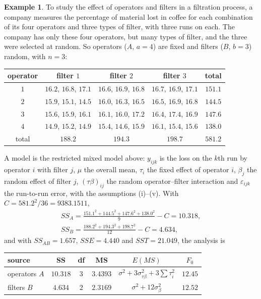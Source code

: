 \documentclass[11pt,a4paper]{article}
\numberwithin{equation}{section}
\theoremstyle{definition}
\newtheorem{exa}[thm]{Example}
\begin{document}
\begin{exa}\label{exa:filter-mixed}
To study the effect of operators and filters in a filtration process, a company measures the percentage of material lost in coffee for each
combination of its four operators and three types of filter, with three runs on each. The company has only these four operators, but many types of
filter, and the three were selected at random. So operators ($A$, $a = 4$) are fixed and filters ($B$, $b = 3$) random, with $n = 3$:
\begin{center}
\begin{tabular}{c|ccc|c}
operator & filter $1$ & filter $2$ & filter $3$ & total \\
\hline
$1$ & $16.2$, $16.8$, $17.1$ & $16.6$, $16.9$, $16.8$ & $16.7$, $16.9$, $17.1$ & $151.1$ \\
$2$ & $15.9$, $15.1$, $14.5$ & $16.0$, $16.3$, $16.5$ & $16.5$, $16.9$, $16.8$ & $144.5$ \\
$3$ & $15.6$, $15.9$, $16.1$ & $16.1$, $16.0$, $17.2$ & $16.4$, $17.4$, $16.9$ & $147.6$ \\
$4$ & $14.9$, $15.2$, $14.9$ & $15.4$, $14.6$, $15.9$ & $16.1$, $15.4$, $15.6$ & $138.0$ \\
\hline
total & $188.2$ & $194.3$ & $198.7$ & $581.2$
\end{tabular}
\end{center}
A model is the restricted mixed model above: $y_{ijk}$ is the loss on the $k$th run by operator $i$ with filter $j$, $\mu$ the overall mean, $\tau_i$ the fixed effect of operator $i$,
$\beta_j$ the random effect of filter $j$, $(\tau\beta)_{ij}$ the random operator--filter interaction and $\varepsilon_{ijk}$ the run-to-run error, with the assumptions (i)--(v). With
$C = 581.2^2/36 = 9383.1511$,
\begin{gather*}
SS_A = \frac{151.1^2 + 144.5^2 + 147.6^2 + 138.0^2}9 - C = 10.318 , \\
SS_B = \frac{188.2^2 + 194.3^2 + 198.7^2}{12} - C = 4.634 ,
\end{gather*}
and with $SS_{AB} = 1.657$, $SSE = 4.440$ and $SST = 21.049$, the analysis is
\begin{center}
\begin{tabular}{l|ccccc}
source & SS & df & MS & $E(MS)$ & $F_0$ \\
\hline
operators $A$ & $10.318$ & $3$ & $3.4393$ & $\sigma^2 + 3\sigma^2_{\tau\beta} + 3\sum\tau_i^2$ & $12.45$ \\
filters $B$ & $4.634$ & $2$ & $2.3169$ & $\sigma^2 + 12\sigma^2_\beta$ & $12.52$ \\

\end{tabular}
\end{center}
\end{exa}
\end{document}
